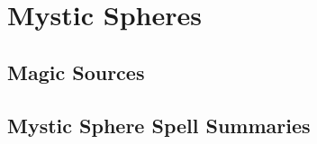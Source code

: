 \chapter{Mystic Spheres}\label{Mystic Spheres}

\section{Magic Sources}\label{Magic Sources}

    

\newpage
\section{Mystic Sphere Spell Summaries}\label{Mystic Sphere Spell Summaries}

    



